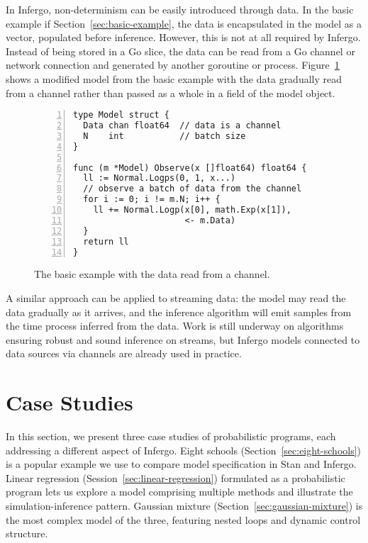 \documentclass[sigplan,review,10pt,anonymous]{acmart}
\begin{document}
\begin{sloppypar}
In Infergo, non-determinism can be easily introduced through
data. In the basic example if Section~\ref{sec:basic-example},
the data is encapsulated in the model as a vector, populated
before inference. However, this is not at all required by
Infergo.  Instead of being stored in a Go slice, the data can be
read from a Go channel or network connection and generated by
another goroutine or process.
Figure~\ref{fig:basic-example-channel} shows a modified model
from the basic example with the data gradually read from a
channel rather than passed as a whole in a field of the model
object.
\begin{figure}
  \begin{lstlisting}[framexleftmargin=10pt,numbers=left]
type Model struct {
  Data chan float64  // data is a channel
  N    int           // batch size
}

func (m *Model) Observe(x []float64) float64 {
  ll := Normal.Logps(0, 1, x...)
  // observe a batch of data from the channel
  for i := 0; i != m.N; i++ {
    ll += Normal.Logp(x[0], math.Exp(x[1]),
                      <- m.Data)
  }
  return ll
}
  \end{lstlisting}
  \caption{The basic example with the data read from a channel.}
  \label{fig:basic-example-channel}
\end{figure}

A similar approach can be applied to streaming data: the model
may read the data gradually as it arrives, and the inference
algorithm will emit samples from the time process inferred from
the data. Work is still underway on algorithms ensuring robust
and sound inference on streams, but Infergo models connected to
data sources via channels are already used in practice.

\section{Case Studies}
\label{sec:case-studies}

In this section, we present three case studies of probabilistic
programs, each addressing a different aspect of Infergo. Eight
schools (Section~\ref{sec:eight-schools}) is a popular example  we
use to compare model specification in Stan and Infergo. Linear
regression (Session~\ref{sec:linear-regression}) formulated as a
probabilistic program lets us explore a model comprising
multiple methods and illustrate the simulation-inference pattern.
Gaussian mixture (Section~\ref{sec:gaussian-mixture}) is
the most complex model of the three, featuring nested loops and
dynamic control structure.


\end{sloppypar}
\end{document}
